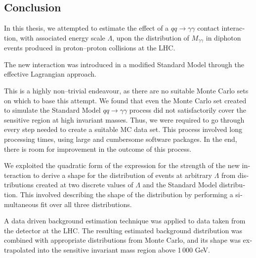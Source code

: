 






\begin{english}












\chapter{Conclusion}
In this thesis, we attempted to estimate the effect of a $qq\rightarrow\gamma\gamma$ contact interaction, with associated energy scale $\Lambda$, upon the distribution of $M_{\gamma\gamma}$ in diphoton events produced in proton--proton collisions at the LHC.

The new interaction was introduced in a modified Standard Model through the effective Lagrangian approach.

This is a highly non--trivial endeavour, as there are no suitable \atlas{} Monte Carlo sets on which to base this attempt. We found that even the Monte Carlo set created to simulate the Standard Model $qq\rightarrow\gamma\gamma$ process did not satisfactorily cover the sensitive region at high invariant masses. Thus, we were required to go through every step needed to create a suitable MC data set. This process involved long processing times, using large and cumbersome software packages. In the end, there is room for improvement in the outcome of this process.

We exploited the quadratic form of the expression for the strength of the new interaction to derive a shape for the distribution of events at arbitrary $\Lambda$ from distributions created at two discrete values of $\Lambda$ and the Standard Model distribution. This involved describing the shape of the distribution by performing a simultaneous fit over all three distributions.

A data driven background estimation technique was applied to data taken from the \atlas{} detector at the LHC. The resulting estimated background distribution was combined with appropriate distributions from Monte Carlo, and its shape was extrapolated into the sensitive invariant mass region above 1\,000 GeV.


\end{english}
